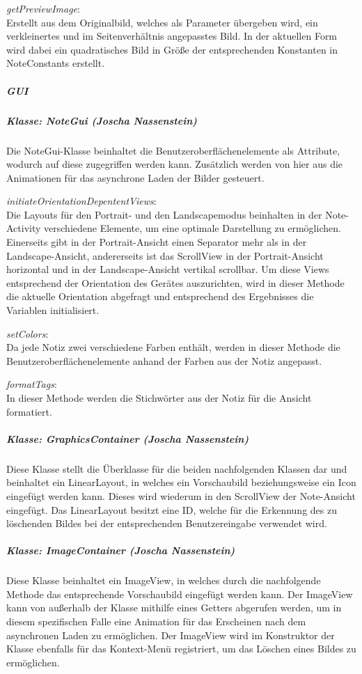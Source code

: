 \textit{getPreviewImage}:\\
Erstellt aus dem Originalbild, welches als Parameter übergeben wird, ein verkleinertes und im Seitenverhältnis angepasstes Bild. In der aktuellen Form wird dabei ein quadratisches Bild in Größe der entsprechenden Konstanten in NoteConstants erstellt.

\subparagraph{GUI}
\subparagraph*{Klasse: NoteGui (Joscha Nassenstein)}
Die NoteGui-Klasse beinhaltet die Benutzeroberflächenelemente als Attribute, wodurch auf diese zugegriffen werden kann. Zusätzlich werden von hier aus die Animationen für das asynchrone Laden der Bilder gesteuert.

\textit{initiateOrientationDepententViews}:\\
Die Layouts für den Portrait- und den Landscapemodus beinhalten in der Note-Activity verschiedene Elemente, um eine optimale Darstellung zu ermöglichen. Einerseits gibt in der Portrait-Ansicht einen Separator mehr als in der Landscape-Ansicht, andererseits ist das ScrollView in der Portrait-Ansicht horizontal und in der Landscape-Ansicht vertikal scrollbar. Um diese Views entsprechend der Orientation des Gerätes auszurichten, wird in dieser Methode die aktuelle Orientation abgefragt und entsprechend des Ergebnisses die Variablen initialisiert.

\textit{setColors}:\\
Da jede Notiz zwei verschiedene Farben enthält, werden in dieser Methode die Benutzeroberflächenelemente anhand der Farben aus der Notiz angepasst.

\textit{formatTags}:\\
In dieser Methode werden die Stichwörter aus der Notiz für die Ansicht formatiert.

\subparagraph*{Klasse: GraphicsContainer (Joscha Nassenstein)}
Diese Klasse stellt die Überklasse für die beiden nachfolgenden Klassen dar und beinhaltet ein LinearLayout, in welches ein Vorschaubild beziehungsweise ein Icon eingefügt werden kann. Dieses wird wiederum in den ScrollView der Note-Ansicht eingefügt. Das LinearLayout besitzt eine ID, welche für die Erkennung des zu löschenden Bildes bei der entsprechenden Benutzereingabe verwendet wird.

\subparagraph*{Klasse: ImageContainer (Joscha Nassenstein)}
Diese Klasse beinhaltet ein ImageView, in welches durch die nachfolgende Methode das entsprechende Vorschaubild eingefügt werden kann. Der ImageView kann von außerhalb der Klasse mithilfe eines Getters abgerufen werden, um in diesem spezifischen Falle eine Animation für das Erscheinen nach dem asynchronen Laden zu ermöglichen. Der ImageView wird im Konstruktor der Klasse ebenfalls für das Kontext-Menü registriert, um das Löschen eines Bildes zu ermöglichen.

